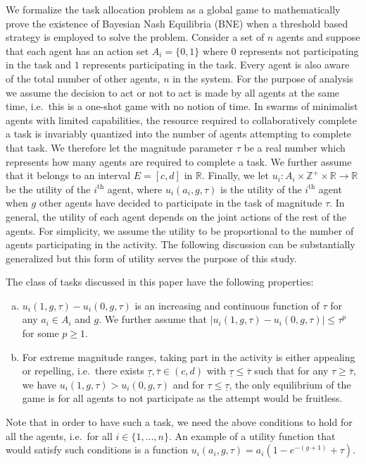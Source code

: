 \documentclass{nature}
\def\Z{\mathbb{Z}}    %
\def\R{\mathbb{R}}    %
\begin{document}
We formalize the task allocation problem as a global game to mathematically prove the existence of Bayesian Nash Equilibria (BNE) when a threshold based strategy is employed to solve the problem. Consider a set of $n$ agents and suppose that each agent has an action set $A_i=\{0,1\}$ where $0$ represents not participating in the task and $1$ represents participating in the task. Every agent is also aware of the total number of other agents, $n$ in the system. For the purpose of analysis we assume the decision to act or not to act is made by all agents at the same time, i.e.\ this is a one-shot game with no notion of time. In swarms of minimalist agents with limited capabilities, the resource required to collaboratively complete a task is invariably quantized into the number of agents attempting to complete that task. We therefore let the magnitude parameter $\tau$ be a real number which represents how many agents are required to complete a task. We further assume that it belongs to an interval $E=[c,d]$ in $\R$. Finally, we let $u_i:A_i\times\Z^+\times \R\to \R$ be the utility of the $i^{\text{th}}$ agent, where $u_i(a_i,g,\tau)$ is the utility of the $i^{\text{th}}$ agent when $g$ other agents have decided to participate in the task of magnitude $\tau$. In general, the utility of each agent depends on the joint actions of the rest of the agents. For simplicity, we assume the utility to be proportional to the number of agents participating in the activity. The following discussion can be substantially generalized but this form of utility serves the purpose of this study. 

The class of tasks discussed in this paper have the following properties:
\begin{enumerate}[a.]
	\item $u_i(1,g,\tau)-u_i(0,g,\tau)$ is an increasing and continuous function of $\tau$ for any $a_i\in A_i$ and $g$. We further assume that $|u_i(1,g,\tau)-u_i(0,g,\tau)|\leq \tau^p$ for some $p\geq 1$.
	\item For extreme magnitude ranges, taking part in the activity is either appealing or repelling, i.e.\ there exists $\underline{\tau},\bar{\tau}\in (c,d)$ with $\underline{\tau}\leq \bar{\tau}$ such that for any $\tau\geq \bar{\tau}$, we have $u_i(1,g,\tau)>u_i(0,g,\tau)$ and for $\tau\leq \underline{\tau}$, the only equilibrium of the game is for all agents to not participate as the attempt would be fruitless.
\end{enumerate}
%
Note that in order to have such a task, we need the above conditions to hold for all the agents, i.e.\ for all $i\in\{1,\ldots,n\}$. An example of a utility function that would satisfy such conditions is a function $u_i(a_i,g,\tau)=a_i(1-e^{-(g+1)}+\tau)$. 
\end{document}
